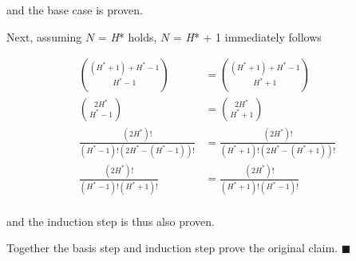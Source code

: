 \noindent and the base case is proven.

\vspace{5mm}

Next, assuming $N$ = \textit{H}* holds,  $N$ = \textit{H}* + 1 immediately follows

\begin{align*}
\binom{(H^* + 1) + H^* - 1}{H^* - 1} &= \binom{(H^* + 1) + H^* - 1}{H^* + 1} \\
\binom{2H^*}{H^* - 1} &= \binom{2H^*}{H^* + 1} \\
\frac{(2H^*)!}{(H^* - 1)!(2H^* - (H^* - 1))!} &= \frac{(2H^*)!}{(H^* + 1)!(2H^* - (H^* + 1))!} \\
\frac{(2H^*)!}{(H^* - 1)!(H^* + 1)!} &= \frac{(2H^*)!}{(H^* + 1)!(H^* - 1)!} \\
\end{align*}

\noindent and the induction step is thus also proven.

\vspace{5mm}  

Together the basis step and induction step prove the original claim. $\blacksquare$ 


